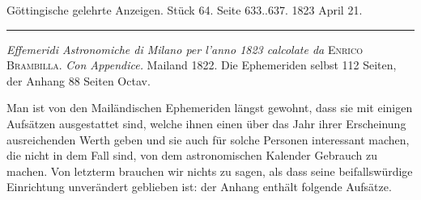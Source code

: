 \clearpage
{}
\begin{center}\small Göttingische gelehrte Anzeigen. Stück 64. Seite 633..637. 1823 April 21.\\[3pt]\rule{.72\linewidth}{.3pt}\end{center}

\emph{Effemeridi Astronomiche di Milano per l'anno \textup{1823} calcolate da} \textsc{Enrico Brambilla}. \emph{Con Appendice.} Mailand 1822. Die Ephemeriden selbst 112 Seiten, der Anhang 88 Seiten Octav.

Man ist von den Mailändischen Ephemeriden längst gewohnt, dass sie mit einigen Aufsätzen ausgestattet sind, welche ihnen einen über das Jahr ihrer Erscheinung ausreichenden Werth geben und sie auch für solche Personen interessant machen, die nicht in dem Fall sind, von dem astronomischen Kalender Gebrauch zu machen. Von letzterm brauchen wir nichts zu sagen, als dass seine beifallswürdige Einrichtung unverändert geblieben ist: der Anhang enthält folgende Aufsätze.

